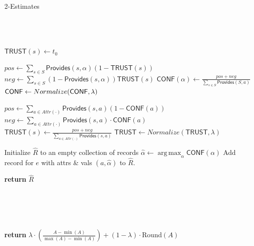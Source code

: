 \documentclass{acm_proc_article-sp}
\DeclareMathOperator*{\argmax}{arg\,max}
\begin{document}
\begin{algorithm}
	\small
\caption{2-Estimates}
\label{alg:2e} 
\begin{algorithmic}[1]
	 \\
	 \\
 \\
		\State  $\mathsf{TRUST}(s) \gets t_0$
	\EndFor

			\State $pos \leftarrow \sum_{s\in S} \mathsf{Provides}(s,\alpha){(1- \mathsf{TRUST}(s))}$
			\State $neg \gets \sum_{s\in S} (1-\mathsf{Provides}(s,\alpha)){\mathsf{TRUST}(s)}$
			\State $\mathsf{CONF}(\alpha) \gets \frac{pos + neg}{\sum_{s \in S} \mathsf{Provides}(S,a)}$ 
		\EndFor
	\EndFor
	\State $\mathsf{CONF} \leftarrow {\sc Normalize}(\mathsf{CONF},\lambda)$

		\State $pos \gets \sum_{a\in Attr(\cdot)}{\mathsf{Provides}(s,a)(1- \mathsf{CONF}(a))}$
		\State $neg \gets \sum_{a\in Attr(\cdot)}\mathsf{Provides}(s,a)\cdot{\mathsf{CONF}(a)}$ 
		\State $\mathsf{TRUST}(s) \gets \frac{pos + neg}{\sum_{a\in Attr(\cdot)}{\mathsf{Provides}(s,a)}}$ 
	\EndFor
	\State $\mathsf{TRUST} \gets Normalize(\mathsf{TRUST},\lambda)$

	\State Initialize $\hat{R}$ to an empty collection of records
		\State $\hat{\alpha} \leftarrow \argmax_{\alpha} \mathsf{CONF}(\alpha)$
		\EndFor
		\State Add record for $e$ with attrs \& vals $(a, \hat{\alpha})$ to $\hat{R}$.
	\EndFor

\EndWhile
\State \textbf{return} $\hat{R}$
\EndFunction

 \\

 \\
 \\
 \\

\State \textbf{return} $\lambda \cdot \left (\frac{A - \min(A)}{\max(A)-\min(A)} \right) + (1-\lambda) \cdot ${\sc Round}$( A )$

\EndFunction
\end{algorithmic}
\end{algorithm}  
\end{document}
